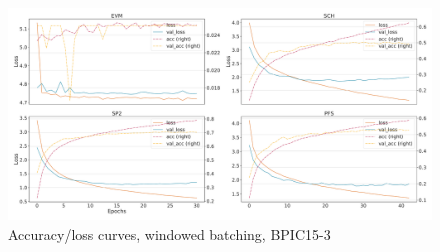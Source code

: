 \begin{figure}[!htb]
    \centering
    \includegraphics[width=\textwidth]{gfx/bpic2015_3/windowed_loss_acc_curve.pdf}
    \caption{Accuracy/loss curves, windowed batching, BPIC15-3}
\end{figure}
\FloatBarrier

